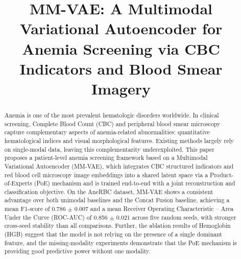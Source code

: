 \documentclass[conference]{IEEEtran}
\begin{document}
\title{MM-VAE: A Multimodal Variational Autoencoder for Anemia Screening via CBC Indicators and Blood Smear Imagery}

\author{
\and
{}
\and
{}
\and
{}
}

\maketitle

\begingroup
\renewcommand\thefootnote{}
\endgroup

\begin{abstract}
Anemia is one of the most prevalent hematologic disorders worldwide. In clinical screening, Complete Blood Count (CBC) and peripheral blood smear microscopy capture complementary aspects of anemia-related abnormalities: quantitative hematological indices and visual morphological features. Existing methods largely rely on single-modal data, leaving this complementarity underexploited. This paper proposes a patient-level anemia screening framework based on a Multimodal Variational Autoencoder (MM-VAE), which integrates CBC structured indicators and red blood cell microscopy image embeddings into a shared latent space via a Product-of-Experts (PoE) mechanism and is trained end-to-end with a joint reconstruction and classification objective. On the AneRBC dataset, MM-VAE shows a consistent advantage over both unimodal baselines and the Concat Fusion baseline, achieving a mean F1-score of 0.786 $\pm$ 0.007 and a mean Receiver Operating Characteristic -- Area Under the Curve (ROC-AUC) of 0.856 $\pm$ 0.021 across five random seeds, with stronger cross-seed stability than all comparisons. Further, the ablation results of Hemoglobin (HGB) suggest that the model is not relying on the presence of a single dominant feature, and the missing-modality experiments demonstrate that the PoE mechanism is providing good predictive power without one modality.
\end{abstract}
\end{document}
